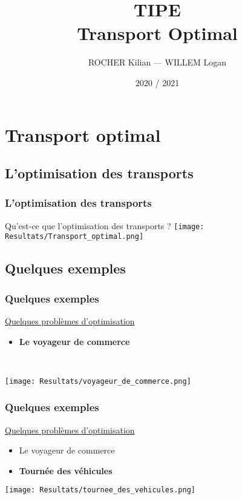 \documentclass[10pt]{beamer}
\title[TIPE — Transport Optimal]{TIPE \\ Transport Optimal}
\author{ROCHER Kilian — WILLEM Logan}
\date{2020 / 2021}
\begin{document}
	\begin{frame}[plain]
		\maketitle
	\end{frame}

	\begin{frame}[plain]
		\tableofcontents
	\end{frame}

	\section{Transport optimal}
	
	\subsection{L'optimisation des transports}
	
	\begin{frame}
		\frametitle{L'optimisation des transports}
		\begin{center}
			Qu'est-ce que l'optimisation des transports ?
			\texttt{[image: Resultats/Transport\_optimal.png]}
		\end{center}
	\end{frame}
	
	\subsection{Quelques exemples}
	
	\begin{frame}
		\frametitle{Quelques exemples}
		\underline{Quelques problèmes d'optimisation}
		\pause
		\begin{itemize}[label=—]
			\item \textbf{Le voyageur de commerce}
		\end{itemize}
		\ \\
		\begin{center}
			\texttt{[image: Resultats/voyageur\_de\_commerce.png]}
		\end{center}
	\end{frame}

	\begin{frame}
		\frametitle{Quelques exemples}
		\underline{Quelques problèmes d'optimisation}
		\begin{itemize}[label=—]
			\item Le voyageur de commerce
			\item \textbf{Tournée des véhicules}
		\end{itemize}
		\begin{center}
			\texttt{[image: Resultats/tournee\_des\_vehicules.png]}
		\end{center}
	\end{frame}
\end{document}
